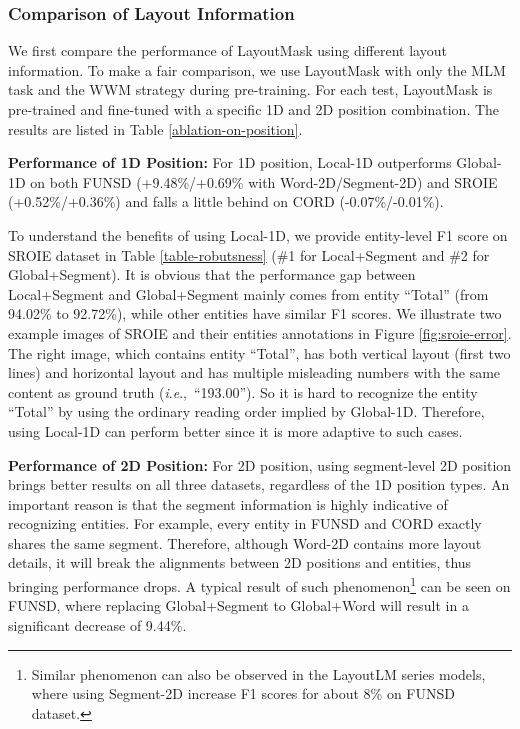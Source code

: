 \documentclass[11pt]{article}
\newcommand{\ie}{\textit{i}.\textit{e}.,\ }
\begin{document}
\subsubsection{Comparison of Layout Information }
\label{sec:layout-ablation}
We first compare the performance of LayoutMask using different layout information.
To make a fair comparison, we use LayoutMask with only the MLM task and the WWM strategy during pre-training.
For each test, LayoutMask is pre-trained and fine-tuned with a specific 1D and 2D position combination.
The results are listed in Table \ref{ablation-on-position}. 

\noindent\textbf{Performance of 1D Position:}
For 1D position, Local-1D outperforms Global-1D on both FUNSD (+9.48\%/+0.69\% with Word-2D/Segment-2D) and SROIE (+0.52\%/+0.36\%) and falls a little behind on CORD (-0.07\%/-0.01\%). 


To understand the benefits of using Local-1D, we provide entity-level F1 score on SROIE dataset in Table \ref{table-robutsness} (\#1 for Local+Segment and \#2 for Global+Segment). 
It is obvious that the performance gap between Local+Segment and Global+Segment mainly comes from entity ``Total'' (from 94.02\% to 92.72\%), while other entities have similar F1 scores.
We illustrate two example images of SROIE and their entities annotations in Figure \ref{fig:sroie-error}.
The right image, which contains entity ``Total'', has both vertical layout (first two lines) and horizontal layout and has multiple misleading numbers with the same content as ground truth (\ie ``193.00'').
So it is hard to recognize the entity ``Total'' by using the ordinary reading order implied by Global-1D. 
Therefore, using Local-1D can perform better since it is more adaptive to such cases.

\noindent\textbf{Performance of 2D Position:}
For 2D position, using segment-level 2D position brings better results on all three datasets, regardless of the 1D position types. 
An important reason is that the segment information is highly indicative of recognizing entities.
For example, every entity in FUNSD and CORD exactly shares the same segment. 
Therefore, although Word-2D contains more layout details, it will break the alignments between 2D positions and entities, thus bringing performance drops.
A typical result of such phenomenon\footnote{Similar phenomenon can also be observed in the LayoutLM series models, where using Segment-2D increase F1 scores for about 8\% on FUNSD dataset.} can be seen on FUNSD, where replacing Global+Segment to Global+Word will result in a significant decrease of 9.44\%.
\end{document}
